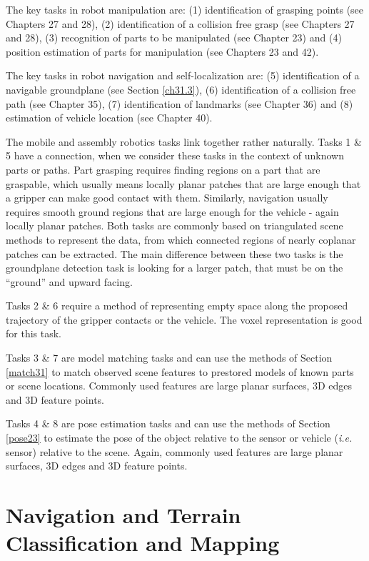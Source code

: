 \documentclass[twocolumn,oneside]{book}
\begin{document}
The key tasks in robot manipulation are:
(1) identification of grasping points (see Chapters 27 and 28),
(2) identification of a collision free grasp (see Chapters 27 and 28),
(3) recognition of parts to be manipulated (see Chapter 23) and
(4) position estimation of parts for manipulation (see Chapters 23 and 42).

The key tasks in robot navigation and self-localization are:
(5) identification of a navigable groundplane (see Section \ref{ch31.3}),
(6) identification of a collision free path (see Chapter 35),
(7) identification of landmarks (see Chapter 36) and
(8) estimation of vehicle location (see Chapter 40).

The mobile and assembly robotics tasks link together rather
naturally.
Tasks 1 \& 5 have a connection, when we consider these tasks
in the context of unknown parts or paths. Part grasping requires
finding regions on a part that are graspable, which usually means locally
planar patches that are large enough that a gripper can make good contact
with them.
Similarly, navigation usually requires smooth ground regions that are
large enough for the vehicle - again locally planar patches.
Both tasks are commonly based on triangulated scene methods to
represent the data, from which connected regions of nearly coplanar
patches can be extracted.
The main difference between these two tasks is the groundplane
detection task is looking for a larger patch, that must be on the
``ground'' and upward facing.

Tasks 2 \& 6 require a method of representing empty space along the 
proposed trajectory of the gripper contacts or the vehicle.
The voxel representation is good for this task.

Tasks 3 \& 7 are model matching tasks and can use the methods of
Section \ref{match31} to match observed scene features to prestored
models of known parts or scene locations.
Commonly used features are large planar surfaces, 3D edges and 3D feature
points.

Tasks 4 \& 8 are pose estimation tasks and can use the methods of
Section \ref{pose23} to estimate the pose of the object 
relative to the sensor or vehicle ({\it i.e.} sensor) relative to the scene.
Again, commonly used features are large planar surfaces, 3D edges and 3D feature
points.


\section{Navigation and Terrain Classification and Mapping  \label{ch31.3}}
\end{document}
